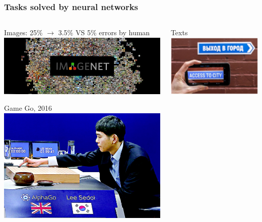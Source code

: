 \documentclass[fullscreen=true, bookmarks=true, hyperref={pdfencoding=unicode}]{beamer}
\begin{document}
\begin{frame}
  \frametitle{Tasks solved by neural networks}

  \begin{columns}
      \begin{column}{.3\paperwidth}
      Images: 25\% $\to$ 3.5\% VS 5\% errors by human
      \includegraphics[keepaspectratio,       width=.3\paperwidth]{image_net.jpg}
      
      \vspace{0.5cm}
      Game Go, 2016
      \includegraphics[keepaspectratio,       width=.3\paperwidth]{alpha_go.jpg}
      \end{column}
      
      \begin{column}{.3\paperwidth}
      Texts
      \includegraphics[keepaspectratio,       width=.3\paperwidth]{machine_translation.png}
      

\end{column}
\end{columns}
\end{frame}
\end{document}
